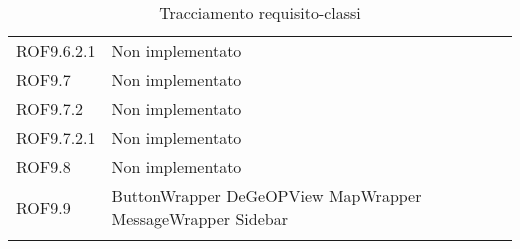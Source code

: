 \begin{longtable}{p{2.5cm}!{\VRule[1pt]}p{5cm}}
	ROF9.6.2.1 & Non implementato\\
	ROF9.7 & Non implementato\\
	ROF9.7.2 & Non implementato\\
	ROF9.7.2.1 & Non implementato\\
	ROF9.8 & Non implementato\\
	ROF9.9 & ButtonWrapper \newline DeGeOPView \newline MapWrapper \newline MessageWrapper \newline Sidebar\\
	\caption{Tracciamento requisito-classi}
\end{longtable}
